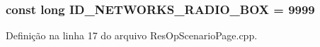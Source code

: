 \subsubsection[{I\+D\+\_\+\+N\+E\+T\+W\+O\+R\+K\+S\+\_\+\+R\+A\+D\+I\+O\+\_\+\+B\+OX}]{\setlength{\rightskip}{0pt plus 5cm}const long I\+D\+\_\+\+N\+E\+T\+W\+O\+R\+K\+S\+\_\+\+R\+A\+D\+I\+O\+\_\+\+B\+OX = 9999}\label{_res_op_scenario_page_8cpp_ad0e8ae1e10ba44843446d3926573b40d}


Definição na linha 17 do arquivo Res\+Op\+Scenario\+Page.\+cpp.

